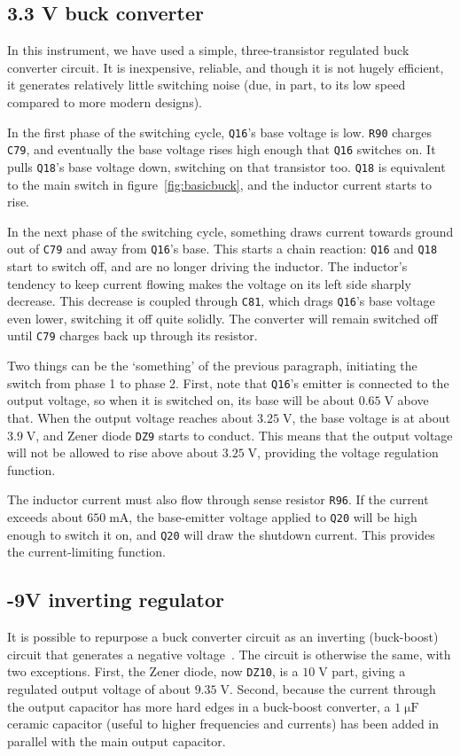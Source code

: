 \documentclass[article,oneside]{memoir}
\newcommand{\refdes}[1]{\texttt{#1}}
\newcommand{\mr}[1]{\ensuremath{\mathrm{#1}}}
\begin{document}
\begin{multicols}{2}
\subsection{3.3 V buck converter}

In this instrument, we have used a simple, three-transistor regulated buck
converter circuit. It is inexpensive, reliable, and though it is not hugely
efficient, it generates relatively little switching noise (due, in part, to
its low speed compared to more modern designs).

In the first phase of the switching cycle, \refdes{Q16}'s base voltage is
low. \refdes{R90} charges \refdes{C79}, and eventually the base voltage rises
high enough that \refdes{Q16} switches on. It pulls \refdes{Q18}'s base voltage
down, switching on that transistor too. \refdes{Q18} is equivalent to the main
switch in figure~\ref{fig:basicbuck}, and the inductor current starts to rise.

In the next phase of the switching cycle, something draws current towards ground
out of \refdes{C79} and away from \refdes{Q16}'s base. This starts a chain reaction:
\refdes{Q16} and \refdes{Q18} start to switch off, and are no longer driving the
inductor. The inductor's tendency to keep current flowing makes the voltage on its
left side sharply decrease. This decrease is coupled through \refdes{C81}, which
drags \refdes{Q16}'s base voltage even lower, switching it off quite solidly.
The converter will remain switched off until \refdes{C79} charges back up through
its resistor.

Two things can be the `something' of the previous paragraph, initiating the
switch from phase 1 to phase 2. First, note that \refdes{Q16}'s emitter is
connected to the output voltage, so when it is switched on, its base will be
about $0.65\;\mr{V}$ above that. When the output voltage reaches about
$3.25\;\mr{V}$, the base voltage is at about $3.9\;\mr{V}$, and Zener diode
\refdes{DZ9} starts to conduct. This means that the output voltage will not be
allowed to rise above about $3.25\;\mr{V}$, providing the voltage regulation
function.

The inductor current must also flow through sense resistor \refdes{R96}. If the
current exceeds about $650\;\mr{mA}$, the base-emitter voltage applied to
\refdes{Q20} will be high enough to switch it on, and \refdes{Q20} will draw the
shutdown current. This provides the current-limiting function.

\subsection{-9V inverting regulator}
It is possible to repurpose a buck converter circuit as an inverting
(buck-boost) circuit that generates a negative voltage~\cite{buckinv}. The
circuit is otherwise the same, with two exceptions. First, the Zener diode, now
\refdes{DZ10}, is a $10\;\mr{V}$ part, giving a regulated output voltage of
about $9.35\;\mr{V}$. Second, because the current through the output capacitor
has more hard edges in a buck-boost converter, a $1\;\mr{\mu F}$ ceramic
capacitor (useful to higher frequencies and currents) has been added in
parallel with the main output capacitor.


\end{multicols}
\end{document}
